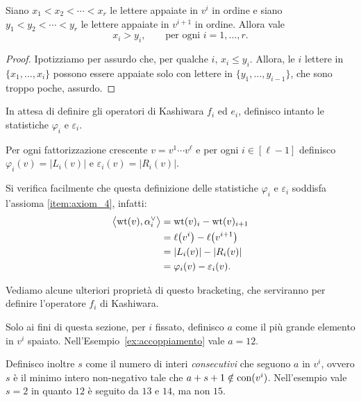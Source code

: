 \begin{lemma}
    \label{lem:lett_appaiate_ordinate}
    Siano $x_1 < x_2 < \cdots < x_r$ le lettere appaiate in $v^i$ in ordine e siano
    $y_1 < y_2 < \cdots < y_r$ le lettere appaiate in $v^{i+1}$ in ordine.
    Allora vale
    \[
        x_i > y_i, \qquad \text{per ogni $i = 1, \dots, r$.}
    \]
\end{lemma}

\begin{proof}
    Ipotizziamo per assurdo che, per qualche $i$, $x_i \leq y_i$.
    Allora, le $i$ lettere in $\{x_1, \dots , x_i\}$ possono essere appaiate
    solo con lettere in $\{y_1, \dots, y_{i-1}\}$, che sono troppo poche, assurdo.
\end{proof}


In attesa di definire gli operatori di Kashiwara $f_i$ ed $e_i$, definisco
intanto le statistiche $\varphi_i$ e $\varepsilon_i$.

\begin{definition}
    Per ogni fattorizzazione crescente $v = v^1 \cdots v^\ell$ e per ogni 
    $i \in [\ell -1]$ definisco 
    $\varphi_i (v) = \lvert L_i(v) \rvert$ e
    $ \varepsilon_i (v) = \lvert R_i(v) \rvert $.
\end{definition}

\begin{remark}
    Si verifica facilmente che questa definizione delle statistiche 
    $\varphi_i$ e $\varepsilon_i$ soddisfa l'assioma \ref{item:axiom_4}, infatti:
    \[
        \begin{split}
            \bigl\langle \operatorname{wt}(v) , \alpha_i^\vee \bigr\rangle
        &= \operatorname{wt}(v)_i - \operatorname{wt}(v)_{i+1}                       \\
        &= \operatorname{\ell}\bigl(v^i\bigr) - \operatorname{\ell}\bigl(v^{i+1}\bigr)  \\
        &= \lvert L_i(v) \rvert - \lvert R_i(v) \rvert   \\
        &= \varphi_i (v) - \varepsilon_i (v).
        \end{split}
    \]
\end{remark}

Vediamo alcune ulteriori propriet\`a di questo bracketing, che serviranno
per definire l'operatore $f_i$ di Kashiwara.

\begin{definition}
    \label{def:a_s}
    Solo ai fini di questa sezione, per $i$ fissato, definisco
    $a$ come il pi\`u grande elemento in $v^i$ spaiato.
    Nell'Esempio~\ref{ex:accoppiamento} vale $a = 12$.

    Definisco inoltre $s$ come il numero di interi \emph{consecutivi} che seguono $a$ in $v^i$, 
    ovvero $s$ \`e il minimo intero non-negativo tale che $a+s+1 \notin \operatorname{con}(v^i)$.
    Nell'esempio vale $s = 2$ in quanto $12$ \`e seguito da $13$ e $14$, ma non $15$.
\end{definition}

